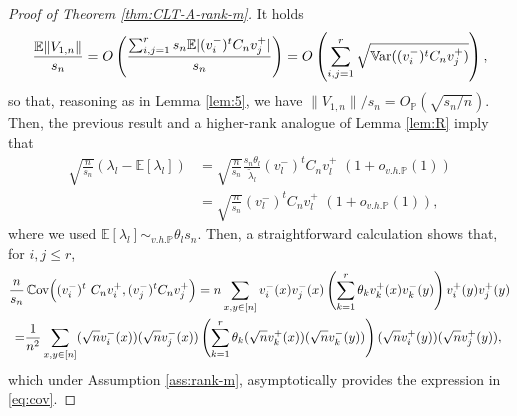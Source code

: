 \documentclass[11pt,oneside]{amsart}
\theoremstyle{plain}
\numberwithin{equation}{section}
\newcommand{\E}{\mathbb{E}}
\newcommand{\var}{\mathbb{V}\hspace{-1.pt}{\rm ar}}
\newcommand{\cov}{\mathbb{C}\hspace{-0.pt}{\rm ov}}
\newcommand{\p}{\mathbb{P}}
\newcommand{\centered}{C_n}
\newcommand{\scaling}{s_n}
\newcommand{\Op}{O_{\p}}
\newcommand{\ohp}{o_{v.h.\p}}
\begin{document}
\begin{proof}[Proof of Theorem \ref{thm:CLT-A-rank-m}]
It holds 
\begin{equation}
    \frac{\E\|V_{1,n}\|}{\scaling}=O\left(\frac{ \sum_{i,j =1}^r 
    \scaling\E|(v_i^-)^t\centered v_j^+|}{\scaling}\right)
    =
    O\left(\sum_{i,j =1}^r 
    \sqrt{\var((v_i^-)^t {\centered}v_j^+)}\right)
    ,
\end{equation}
so that, reasoning as in Lemma \ref{lem:5}, we have $\|V_{1,n}\|/\scaling=\Op ( \sqrt{\scaling/n})$. Then,
the previous result and a higher-rank analogue of Lemma \ref{lem:R} imply that
 \begin{equation}
 \begin{split}
      \sqrt{\frac{n}{\scaling}} \left( \lambda_l - \E[ \lambda_l ]\right)
        &=\sqrt{\frac{{n}}{{\scaling}}} \frac{\scaling \theta_l }{\tilde \lambda_l}   (v_l^-)^t \centered v_l^+ \,\,
        (1+ \ohp \left(1\right))\\
        &= \sqrt{\frac{{n}}{{\scaling}}} (v_l^-)^t  \centered v_l^+ \,\,
        (1+ \ohp \left(1\right)),
    \end{split}
    \end{equation}
    where we used $\E[ \lambda_l ] \sim_{v.h.\p} \theta_l \scaling$. Then, a straightforward calculation shows that, for $i,j \le r$,
    \begin{equation}
    \begin{split}
        {\frac{{n}}{{\scaling}}}& \, \cov\Big((v_i^-)^t \ \centered  v_i^+,(v_j^-)^t \centered  v_j^+\Big)=n\sum_{x,y\in[n]} v_i^-(x)v_j^-(x) \left(\sum_{k=1}^r \theta_k v_k^+(x) v_k^-(y)\right)v_i^+(y)  v_j^+(y)\\
        =&\frac{1}{n^2}\sum_{x,y\in[n]} (\sqrt{n}v_i^-(x))(\sqrt{n}v_j^-(x)) \left(\sum_{k=1}^r \theta_k (\sqrt{n}v_k^+(x)) (\sqrt{n}v_k^-(y))\right)(\sqrt{n}v_i^+(y)) ( \sqrt{n}v_j^+(y)),
    \end{split}
    \end{equation}
    which under Assumption \ref{ass:rank-m}, asymptotically provides the expression in \eqref{eq:cov}.
 \end{proof}

 
\printbibliography
\end{document}
